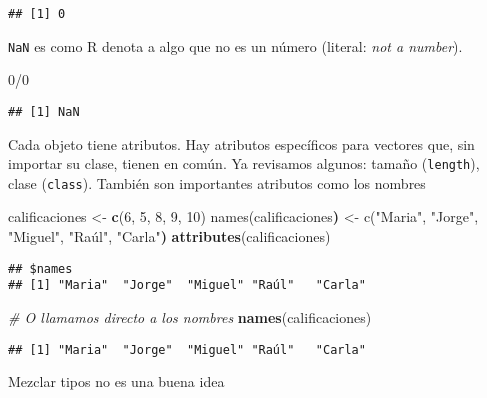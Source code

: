 \documentclass[]{article}
\newenvironment{Shaded}{\begin{snugshade}}{\end{snugshade}}
\newcommand{\KeywordTok}[1]{\textcolor[rgb]{0.13,0.29,0.53}{\textbf{{#1}}}}
\newcommand{\DecValTok}[1]{\textcolor[rgb]{0.00,0.00,0.81}{{#1}}}
\newcommand{\StringTok}[1]{\textcolor[rgb]{0.31,0.60,0.02}{{#1}}}
\newcommand{\CommentTok}[1]{\textcolor[rgb]{0.56,0.35,0.01}{\textit{{#1}}}}
\newcommand{\ErrorTok}[1]{\textbf{{#1}}}
\newcommand{\NormalTok}[1]{{#1}}
\begin{document}
\begin{verbatim}
## [1] 0
\end{verbatim}

\texttt{NaN} es como R denota a algo que no es un número (literal:
\emph{not a number}).

\begin{Shaded}
\begin{Highlighting}[]
\DecValTok{0}\NormalTok{/}\DecValTok{0}
\end{Highlighting}
\end{Shaded}

\begin{verbatim}
## [1] NaN
\end{verbatim}

Cada objeto tiene atributos. Hay atributos específicos para vectores
que, sin importar su clase, tienen en común. Ya revisamos algunos:
tamaño (\texttt{length}), clase (\texttt{class}). También son
importantes atributos como los nombres

\begin{Shaded}
\begin{Highlighting}[]
\NormalTok{calificaciones <-}\StringTok{ }\KeywordTok{c}\NormalTok{(}\DecValTok{6}\NormalTok{, }\DecValTok{5}\NormalTok{, }\DecValTok{8}\NormalTok{, }\DecValTok{9}\NormalTok{, }\DecValTok{10}\NormalTok{)}
\NormalTok{names(calificaciones}\ErrorTok{)} \NormalTok{<- c(}\StringTok{"Maria"}\NormalTok{, }\StringTok{"Jorge"}\NormalTok{, }\StringTok{"Miguel"}\NormalTok{, }\StringTok{"Raúl"}\NormalTok{, }\StringTok{"Carla"}\ErrorTok{)}
\KeywordTok{attributes}\NormalTok{(calificaciones)}
\end{Highlighting}
\end{Shaded}

\begin{verbatim}
## $names
## [1] "Maria"  "Jorge"  "Miguel" "Raúl"   "Carla"
\end{verbatim}

\begin{Shaded}
\begin{Highlighting}[]
\CommentTok{# O llamamos directo a los nombres}
\KeywordTok{names}\NormalTok{(calificaciones)}
\end{Highlighting}
\end{Shaded}

\begin{verbatim}
## [1] "Maria"  "Jorge"  "Miguel" "Raúl"   "Carla"
\end{verbatim}

Mezclar tipos no es una buena idea
\end{document}

